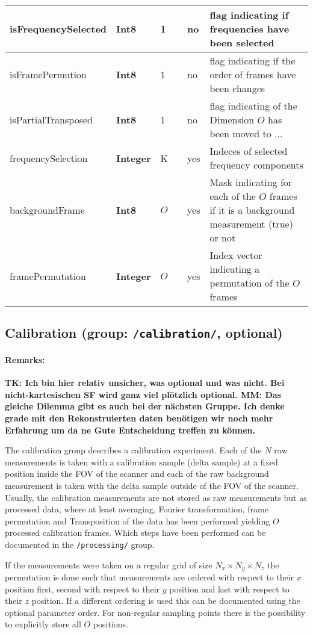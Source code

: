 \documentclass[landscape,a4paper]{article} %
\newcommand{\inl}[1]{\lstinline[columns=fixed]{#1}}
\newcommand{\inltab}[1]{{\ttfamily\bfseries\color{blue}#1}}
\newcommand{\inlvar}[1]{{\ttfamily#1}}
\begin{document}
\begin{tabularx}{\columnwidth}{llp{3cm}llX}
\inlvar{isFrequencySelected} & \inltab{Int8} & 1 & & no & flag indicating if frequencies have been selected \\ \hline 
\inlvar{isFramePermution} & \inltab{Int8} & 1 & & no & flag indicating if the order of frames have been changes \\ \hline 
\inlvar{isPartialTransposed} & \inltab{Int8} & 1 & & no & flag indicating of the Dimension $O$ has been moved to ...\\ \hline
\inlvar{frequencySelection} & \inltab{Integer} & K & & yes & Indeces of selected frequency components \\ \hline
\inlvar{backgroundFrame} & \inltab{Int8} & $O$ & & yes & Mask indicating for each of the $O$ frames if it is a background measurement (true) or not \\ \hline
\inlvar{framePermutation} & \inltab{Integer} & $O$ & & yes & Index vector indicating a permutation of the $O$ frames \\ \hline

\end{tabularx} 

\subsection{Calibration (group: \inl{/calibration/}, optional)}

\begin{multicols}{2}
\paragraph{Remarks:}
\textbf{TK: Ich bin hier relativ unsicher, was optional und was nicht. Bei nicht-kartesischen SF wird ganz viel plötzlich optional. MM: Das gleiche Dilemma gibt es auch bei der nächsten Gruppe. Ich denke grade mit den Rekonstruierten daten benötigen wir noch mehr Erfahrung um da ne Gute Entscheidung treffen zu können.}


The calibration group describes a calibration experiment. Each of the $N$ raw measurements is taken with a calibration sample (delta sample) at a fixed position inside the FOV of the scanner and each of the raw background measurement is taken with the delta sample outside of the FOV of the scanner. Usually, the calibration measurements are not stored as raw measurements but as processed data, where at least averaging, Fourier transformation, frame permutation and Transposition of the data has been performed yielding $O$ processed calibration frames. Which steps have been performed can be documented in the \inl{/processing/} group.

If the measurements were taken on a regular grid of size $N_x \times N_y \times N_z$ the permutation is done such that measurements are ordered with respect to their $x$ position first, second with respect to their $y$ position and last with respect to their $z$ position. If a different ordering is used this can be documented using the optional parameter \inlvar{order}. For non-regular sampling points there is the possibility to explicitly store all $O$ positions.
\end{multicols}
\end{document}
